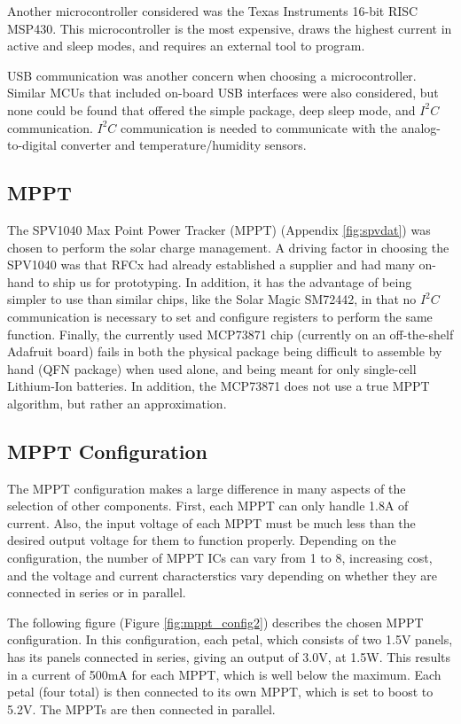 \documentclass{article}
\numberwithin{figure}{section}
\numberwithin{equation}{section}
\begin{document}
{\bigskip
Another microcontroller considered was the Texas Instruments 16-bit RISC MSP430. This microcontroller is the most expensive, draws the highest current in active and sleep modes, and requires an external tool to program.

\bigskip
USB communication was another concern when choosing a microcontroller. Similar MCUs that included on-board USB interfaces were also considered, but none could be found that offered the simple package, deep sleep mode, and $I^2 C$ communication. $I^2 C$ communication is needed to communicate with the analog-to-digital converter and temperature/humidity sensors.

\bigskip


\subsection{MPPT} \label{sect:mppt_just}
The SPV1040 Max Point Power Tracker (MPPT) (Appendix \ref{fig:spvdat}) was chosen to perform the solar charge management. A driving factor in choosing the SPV1040 was that RFCx had already established a supplier and had many on-hand to ship us for prototyping. In addition, it has the advantage of being simpler to use than similar chips, like the Solar Magic SM72442, in that no $I^2 C$ communication is necessary to set and configure registers to perform the same function. Finally, the currently used MCP73871 chip (currently on an off-the-shelf Adafruit board) fails in both the physical package being difficult to assemble by hand (QFN package) when used alone, and being meant for only single-cell Lithium-Ion batteries. In addition, the MCP73871 does not use a true MPPT algorithm, but rather an approximation.

\subsection{MPPT Configuration} \label{sect:mppt_config_just}
The MPPT configuration makes a large difference in many aspects of the selection of other components. First, each MPPT can only handle 1.8A of current. Also, the input voltage of each MPPT must be much less than the desired output voltage for them to function properly. Depending on the configuration, the number of MPPT ICs can vary from 1 to 8, increasing cost, and the voltage and current characterstics vary depending on whether they are connected in series or in parallel.

\bigskip
The following figure (Figure \ref{fig:mppt_config2}) describes the chosen MPPT configuration. In this configuration, each petal, which consists of two 1.5V panels, has its panels connected in series, giving an output of 3.0V, at 1.5W. This results in a current of 500mA for each MPPT, which is well below the maximum. Each petal (four total) is then connected to its own MPPT, which is set to boost to 5.2V. The MPPTs are then connected in parallel.

}
\end{document}
